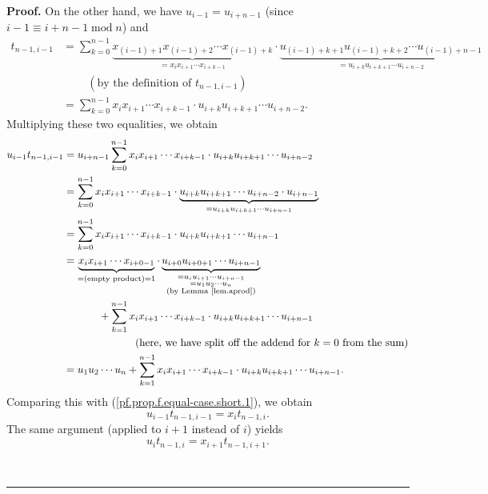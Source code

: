 \documentclass[numbers=enddot,12pt,final,onecolumn,notitlepage]{scrartcl}%
\theoremstyle{definition}
\newenvironment{proof}[1][Proof]{\noindent\textbf{#1.} }{\ \rule{0.5em}{0.5em}}
\let\sumnonlimits\sum
\renewcommand{\sum}{\sumnonlimits\limits}
\newenvironment{vershort}{}{}
\begin{document}
\begin{proof}
\begin{vershort}
On the other hand, we have $u_{i-1}=u_{i+n-1}$ (since $i-1\equiv
i+n-1\operatorname{mod}n$) and%
\begin{align*}
t_{n-1,i-1}  &  =\sum_{k=0}^{n-1}\underbrace{x_{\left(  i-1\right)
+1}x_{\left(  i-1\right)  +2}\cdots x_{\left(  i-1\right)  +k}}_{=x_{i}%
x_{i+1}\cdots x_{i+k-1}}\cdot\underbrace{u_{\left(  i-1\right)  +k+1}%
u_{\left(  i-1\right)  +k+2}\cdots u_{\left(  i-1\right)  +n-1}}%
_{=u_{i+k}u_{i+k+1}\cdots u_{i+n-2}}\\
&  \ \ \ \ \ \ \ \ \ \ \left(  \text{by the definition of }t_{n-1,i-1}\right)
\\
&  =\sum_{k=0}^{n-1}x_{i}x_{i+1}\cdots x_{i+k-1}\cdot u_{i+k}u_{i+k+1}\cdots
u_{i+n-2}.
\end{align*}
Multiplying these two equalities, we obtain%
\begin{align*}
u_{i-1}t_{n-1,i-1}  &  =u_{i+n-1}\sum_{k=0}^{n-1}x_{i}x_{i+1}\cdots
x_{i+k-1}\cdot u_{i+k}u_{i+k+1}\cdots u_{i+n-2}\\
&  =\sum_{k=0}^{n-1}x_{i}x_{i+1}\cdots x_{i+k-1}\cdot\underbrace{u_{i+k}%
u_{i+k+1}\cdots u_{i+n-2}\cdot u_{i+n-1}}_{=u_{i+k}u_{i+k+1}\cdots u_{i+n-1}%
}\\
&  =\sum_{k=0}^{n-1}x_{i}x_{i+1}\cdots x_{i+k-1}\cdot u_{i+k}u_{i+k+1}\cdots
u_{i+n-1}\\
&  =\underbrace{x_{i}x_{i+1}\cdots x_{i+0-1}}_{=\left(  \text{empty
product}\right)  =1}\cdot\underbrace{u_{i+0}u_{i+0+1}\cdots u_{i+n-1}%
}_{\substack{=u_{i}u_{i+1}\cdots u_{i+n-1}\\=u_{1}u_{2}\cdots u_{n}\\\text{(by
Lemma \ref{lem.aprod})}}}\\
&  \ \ \ \ \ \ \ \ \ \ +\sum_{k=1}^{n-1}x_{i}x_{i+1}\cdots x_{i+k-1}\cdot
u_{i+k}u_{i+k+1}\cdots u_{i+n-1}\\
&  \ \ \ \ \ \ \ \ \ \ \ \ \ \ \ \ \ \ \ \ \left(  \text{here, we have split
off the addend for }k=0\text{ from the sum}\right) \\
&  =u_{1}u_{2}\cdots u_{n}+\sum_{k=1}^{n-1}x_{i}x_{i+1}\cdots x_{i+k-1}\cdot
u_{i+k}u_{i+k+1}\cdots u_{i+n-1}.
\end{align*}
Comparing this with (\ref{pf.prop.f.equal-case.short.1}), we obtain%
\begin{equation}
u_{i-1}t_{n-1,i-1}=x_{i}t_{n-1,i}. \label{pf.prop.f.equal-case.short.4}%
\end{equation}
The same argument (applied to $i+1$ instead of $i$) yields%
\begin{equation}
u_{i}t_{n-1,i}=x_{i+1}t_{n-1,i+1}. \label{pf.prop.f.equal-case.short.5}%
\end{equation}



\end{vershort}
\end{proof}
\end{document}
